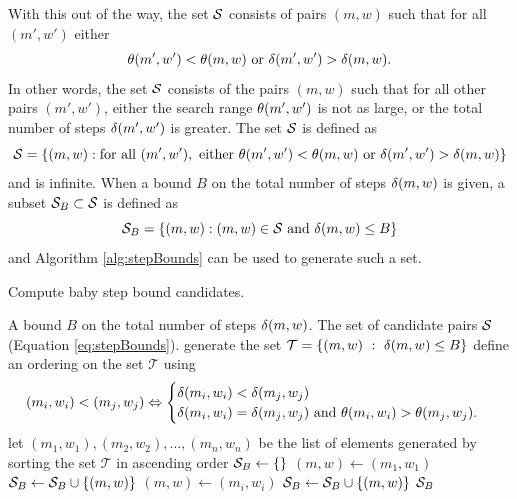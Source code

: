 \documentclass{ucalgthes1}
\theoremstyle{definition}
\begin{document}
With this out of the way, the set $\mathcal S$ consists of pairs $(m, w)$ such that for all $(m', w')$ either
\[
	\theta(m', w') < \theta(m, w) \textrm{ or } \delta(m', w') > \delta(m, w).
\]
In other words, the set $\mathcal S$ consists of the pairs $(m, w)$ such that for all other pairs $(m', w')$, either the search range $\theta(m', w')$ is not as large, or the total number of steps $\delta(m', w')$ is greater.  The set $\mathcal S$ is defined as
\begin{equation}
\label{eq:stepBounds}
  \mathcal S = \left\{ (m, w) : \textrm{for all } (m', w'), \textrm{ either }  \theta(m', w') < \theta(m, w) \textrm{ or } \delta(m', w') > \delta(m, w) \right\}
\end{equation}
and is infinite.  When a bound $B$ on the total number of steps $\delta(m, w)$ is given, a subset $\mathcal S_B \subset \mathcal S$ is defined as
\begin{equation}
\label{eq:stepBoundsB}
   \mathcal S_B = \left\{ (m, w) : (m, w) \in \mathcal S \textrm{ and } \delta(m, w) \le B \right\}
\end{equation}
and Algorithm \ref{alg:stepBounds} can be used to generate such a set.

\begin{algorithm}[htb]
\caption{Compute baby step bound candidates.}
\label{alg:stepBounds}
\begin{algorithmic}[1]
\Require A bound $B$ on the total number of steps $\delta(m, w)$.
\Ensure The set of candidate pairs $\mathcal S$ (Equation \ref{eq:stepBounds}).
\State generate the set $\mathcal T = \{(m, w) ~:~ \delta(m, w) \le B\}$
\State define an ordering on the set $\mathcal T$ using
\[
(m_i, w_i) < (m_j, w_j) \Leftrightarrow \begin{cases}
	\delta(m_i, w_i) < \delta(m_j, w_j) \\
	\delta(m_i, w_i) = \delta(m_j, w_j) \textrm{ and } \theta(m_i, w_i) > \theta(m_j, w_j).
\end{cases}
\]
\State let $(m_1, w_1), (m_2, w_2), ..., (m_n, w_n)$ be the list of elements generated by sorting the set $\mathcal T$ in ascending order
\State $\mathcal S_B \gets \{\}$
\State $(m, w) \gets (m_1, w_1)$
		\State $\mathcal S_B \gets \mathcal S_B \cup \{(m, w)\}$
		\State $(m, w) \gets (m_i, w_i)$
	\EndIf
\EndFor
\State $\mathcal S_B \gets \mathcal S_B \cup \{(m, w)\}$
\State \Return $\mathcal S_B$
\end{algorithmic}
\end{algorithm}
\end{document}
